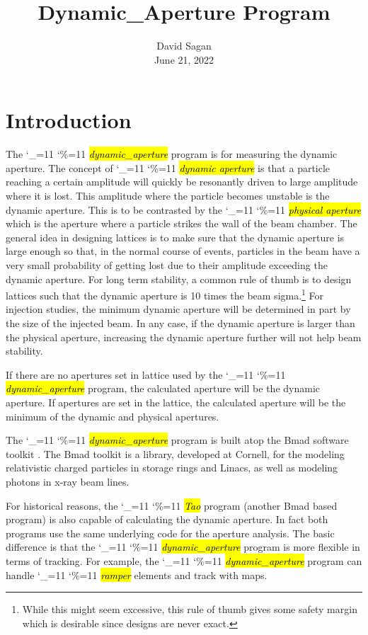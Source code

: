 \documentclass{hitec}
\title{Dynamic_Aperture Program}
\author{}
\date{David Sagan \\ June 21, 2022}
\newcommand\dottcmd[1]{\hl{\em#1}\endgroup}
\newcommand{\vn}{\begingroup\catcode`\_=11 \catcode`\%=11 \dottcmd}
\newcommand{\da}{\vn{dynamic_aperture}\xspace}
\newcommand{\Section}[1]{\section{#1}\vspace*{-1ex}}
\begin{document}

\maketitle

\tableofcontents

\Section{Introduction} 
\label{s:intro}

The \da program is for measuring the dynamic aperture. The concept of \vn{dynamic aperture} is that
a particle reaching a certain amplitude will quickly be resonantly driven to large amplitude where
it is lost. This amplitude where the particle becomes unstable is the dynamic aperture. This is to
be contrasted by the \vn{physical aperture} which is the aperture where a particle strikes the wall
of the beam chamber. The general idea in designing lattices is to make sure that the dynamic
aperture is large enough so that, in the normal course of events, particles in the beam have a very
small probability of getting lost due to their amplitude exceeding the dynamic aperture. For long
term stability, a common rule of thumb is to design lattices such that the dynamic aperture is 10 times
the beam sigma.\footnote
  {
While this might seem excessive, this rule of thumb gives some safety margin which is desirable
since designs are never exact.
  }
For injection studies, the minimum dynamic aperture will be determined in part by the size of the
injected beam. In any case, if the dynamic aperture is larger than the physical aperture, increasing
the dynamic aperture further will not help beam stability. 

If there are no apertures set in lattice used by the \da program, the calculated aperture will be the
dynamic aperture. If apertures are set in the lattice, the calculated aperture will be the minimum of
the dynamic and physical apertures.

The \da program is built atop the Bmad software toolkit \cite{b:bmad}. The Bmad toolkit is a
library, developed at Cornell, for the modeling relativistic charged particles in storage rings and
Linacs, as well as modeling photons in x-ray beam lines.

For historical reasons, the \vn{Tao} program (another Bmad based program) is also capable of
calculating the dynamic aperture. 
In fact both programs use the same underlying code for the
aperture analysis. The basic difference is that the \da program is more flexible in terms
of tracking. For example, the \da program can handle \vn{ramper} elements and track with maps.
\end{document}
